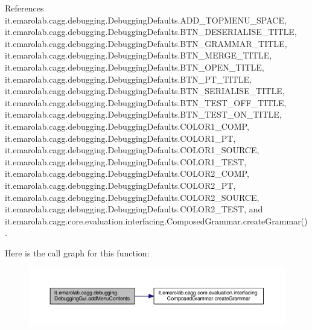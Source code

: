 References it.\-emarolab.\-cagg.\-debugging.\-Debugging\-Defaults.\-A\-D\-D\-\_\-\-T\-O\-P\-M\-E\-N\-U\-\_\-\-S\-P\-A\-C\-E, it.\-emarolab.\-cagg.\-debugging.\-Debugging\-Defaults.\-B\-T\-N\-\_\-\-D\-E\-S\-E\-R\-I\-A\-L\-I\-S\-E\-\_\-\-T\-I\-T\-L\-E, it.\-emarolab.\-cagg.\-debugging.\-Debugging\-Defaults.\-B\-T\-N\-\_\-\-G\-R\-A\-M\-M\-A\-R\-\_\-\-T\-I\-T\-L\-E, it.\-emarolab.\-cagg.\-debugging.\-Debugging\-Defaults.\-B\-T\-N\-\_\-\-M\-E\-R\-G\-E\-\_\-\-T\-I\-T\-L\-E, it.\-emarolab.\-cagg.\-debugging.\-Debugging\-Defaults.\-B\-T\-N\-\_\-\-O\-P\-E\-N\-\_\-\-T\-I\-T\-L\-E, it.\-emarolab.\-cagg.\-debugging.\-Debugging\-Defaults.\-B\-T\-N\-\_\-\-P\-T\-\_\-\-T\-I\-T\-L\-E, it.\-emarolab.\-cagg.\-debugging.\-Debugging\-Defaults.\-B\-T\-N\-\_\-\-S\-E\-R\-I\-A\-L\-I\-S\-E\-\_\-\-T\-I\-T\-L\-E, it.\-emarolab.\-cagg.\-debugging.\-Debugging\-Defaults.\-B\-T\-N\-\_\-\-T\-E\-S\-T\-\_\-\-O\-F\-F\-\_\-\-T\-I\-T\-L\-E, it.\-emarolab.\-cagg.\-debugging.\-Debugging\-Defaults.\-B\-T\-N\-\_\-\-T\-E\-S\-T\-\_\-\-O\-N\-\_\-\-T\-I\-T\-L\-E, it.\-emarolab.\-cagg.\-debugging.\-Debugging\-Defaults.\-C\-O\-L\-O\-R1\-\_\-\-C\-O\-M\-P, it.\-emarolab.\-cagg.\-debugging.\-Debugging\-Defaults.\-C\-O\-L\-O\-R1\-\_\-\-P\-T, it.\-emarolab.\-cagg.\-debugging.\-Debugging\-Defaults.\-C\-O\-L\-O\-R1\-\_\-\-S\-O\-U\-R\-C\-E, it.\-emarolab.\-cagg.\-debugging.\-Debugging\-Defaults.\-C\-O\-L\-O\-R1\-\_\-\-T\-E\-S\-T, it.\-emarolab.\-cagg.\-debugging.\-Debugging\-Defaults.\-C\-O\-L\-O\-R2\-\_\-\-C\-O\-M\-P, it.\-emarolab.\-cagg.\-debugging.\-Debugging\-Defaults.\-C\-O\-L\-O\-R2\-\_\-\-P\-T, it.\-emarolab.\-cagg.\-debugging.\-Debugging\-Defaults.\-C\-O\-L\-O\-R2\-\_\-\-S\-O\-U\-R\-C\-E, it.\-emarolab.\-cagg.\-debugging.\-Debugging\-Defaults.\-C\-O\-L\-O\-R2\-\_\-\-T\-E\-S\-T, and it.\-emarolab.\-cagg.\-core.\-evaluation.\-interfacing.\-Composed\-Grammar.\-create\-Grammar().



Here is the call graph for this function\-:\nopagebreak
\begin{figure}[H]
\begin{center}
\leavevmode
\includegraphics[width=350pt]{classit_1_1emarolab_1_1cagg_1_1debugging_1_1DebuggingGui_af3d8a6d6551e8719a99b66d6808a5fce_cgraph}
\end{center}
\end{figure}


